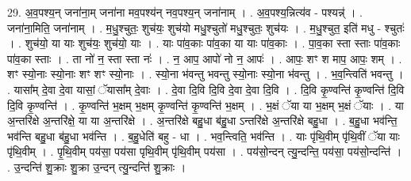 \documentclass[17pt]{extarticle}
\begin{document}
29. अ॒व॒पश्य॒न् जना॑ना॒म् जना॑ना मव॒पश्य॑न् नव॒पश्य॒न् जना॑नाम् । . अ॒व॒पश्य॒न्नित्य॑व - पश्यन्न्॑ । . जना॑ना॒मिति॒ जना॑नाम् । . म॒धु॒श्चुतः॒ शुच॑यः॒ शुच॑यो मधु॒श्चुतो॑ मधु॒श्चुतः॒ शुच॑यः । . म॒धु॒श्चुत॒ इति॑ मधु - श्चुतः॑ । . शुच॑यो॒ या याः शुच॑यः॒ शुच॑यो॒ याः । . याः पा॑व॒काः पा॑व॒का या याः पा॑व॒काः । . पा॒व॒का स्ता स्ताः पा॑व॒काः पा॑व॒का स्ताः । . ता नो॑ न॒ स्ता स्ता नः॑ । . न॒ आप॒ आपो॑ नो न॒ आपः॑ । . आपः॒ शꣳ श माप॒ आपः॒ शम् । . शꣳ स्यो॒नाः स्यो॒नाः शꣳ शꣳ स्यो॒नाः । . स्यो॒ना भ॑वन्तु भवन्तु स्यो॒नाः स्यो॒ना भ॑वन्तु । . भ॒व॒न्त्विति॑ भवन्तु । . यासा᳚म् दे॒वा दे॒वा यासां॒ ॅयासा᳚म् दे॒वाः । . दे॒वा दि॒वि दि॒वि दे॒वा दे॒वा दि॒वि । . दि॒वि कृ॒ण्वन्ति॑ कृ॒ण्वन्ति॑ दि॒वि दि॒वि कृ॒ण्वन्ति॑ । . कृ॒ण्वन्ति॑ भ॒क्षम् भ॒क्षम् कृ॒ण्वन्ति॑ कृ॒ण्वन्ति॑ भ॒क्षम् । . भ॒क्षं ॅया या भ॒क्षम् भ॒क्षं ॅयाः । . या अ॒न्तरि॑क्षे अ॒न्तरि॑क्षे॒ या या अ॒न्तरि॑क्षे । . अ॒न्तरि॑क्षे बहु॒धा ब॑हु॒धा ऽन्तरि॑क्षे अ॒न्तरि॑क्षे बहु॒धा । . ब॒हु॒धा भव॑न्ति॒ भव॑न्ति बहु॒धा ब॑हु॒धा भव॑न्ति । . ब॒हु॒धेति॑ बहु - धा । . भव॒न्त्विति॒ भव॑न्ति । . याः पृ॑थि॒वीम् पृ॑थि॒वीं ॅया याः पृ॑थि॒वीम् । . पृ॒थि॒वीम् पय॑सा॒ पय॑सा पृथि॒वीम् पृ॑थि॒वीम् पय॑सा । . पय॑सो॒न्दन् त्यु॒न्दन्ति॒ पय॑सा॒ पय॑सो॒न्दन्ति॑ । . उ॒न्दन्ति॑ शु॒क्राः शु॒क्रा उ॒न्दन् त्यु॒न्दन्ति॑ शु॒क्राः । \newline
\end{document}
